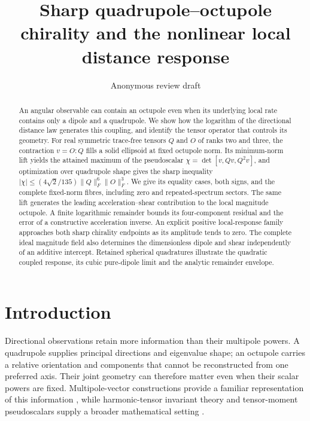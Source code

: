 \documentclass[aps,prd,reprint,onecolumn,11pt,nofootinbib,notitlepage]{revtex4-2}
\begin{document}
\title{Sharp quadrupole--octupole chirality and the nonlinear local distance response}
\author{Anonymous review draft}\noaffiliation

\begin{abstract}

An angular observable can contain an octupole even when its underlying local rate contains only a dipole and a quadrupole. We show how the logarithm of the directional distance law generates this coupling, and identify the tensor operator that controls its geometry. For real symmetric trace-free tensors \(Q\) and \(O\) of ranks two and three, the contraction \(v=O:Q\) fills a solid ellipsoid at fixed octupole norm. Its minimum-norm lift yields the attained maximum of the pseudoscalar \(\chi=\det[v,Qv,Q^2v]\), and optimization over quadrupole shape gives the sharp inequality \(|\chi|\le(4\sqrt2/135)\|Q\|_F^6\|O\|_F^3\). We give its equality cases, both signs, and the complete fixed-norm fibres, including zero and repeated-spectrum sectors. The same lift generates the leading acceleration--shear contribution to the local magnitude octupole. A finite logarithmic remainder bounds its four-component residual and the error of a constructive acceleration inverse. An explicit positive local-response family approaches both sharp chirality endpoints as its amplitude tends to zero. The complete ideal magnitude field also determines the dimensionless dipole and shear independently of an additive intercept. Retained spherical quadratures illustrate the quadratic coupled response, its cubic pure-dipole limit and the analytic remainder envelope.

\end{abstract}
\maketitle
\section{Introduction}

Directional observations retain more information than their multipole powers. A quadrupole supplies principal directions and eigenvalue shape; an octupole carries a relative orientation and components that cannot be reconstructed from one preferred axis. Their joint geometry can therefore matter even when their scalar powers are fixed. Multipole-vector constructions provide a familiar representation of this information \cite{Copi2004}, while harmonic-tensor invariant theory and tensor-moment pseudoscalars supply a broader mathematical setting \cite{Olive2014,Desmorat2021,Pisanty2026}.
\end{document}
